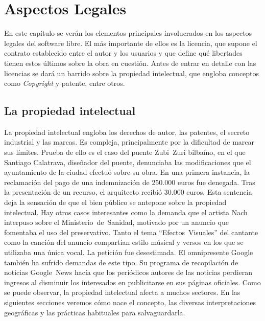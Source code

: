 
\chapter{Aspectos Legales}
En este capítulo se verán los elementos principales involucrados en
los aspectos legales del software libre. El más importante de ellos es
la licencia, que supone el contrato establecido entre el autor y los
usuarios y que define qué libertades tienen estos últimos sobre la
obra en cuestión. Antes de entrar en detalle con las licencias se dará
un barrido sobre la propiedad intelectual, que engloba conceptos como
\emph{Copyright} y patente, entre otros.

\section{La propiedad intelectual}
La propiedad intelectual engloba los derechos de autor, las patentes,
el secreto industrial y las marcas. Es compleja, principalmente por la
dificultad de marcar sus límites. Prueba de ello es el caso del puente
Zubi~Zuri bilbaíno, en el que Santiago Calatrava, diseñador del
puente, denunciaba las modificaciones que el ayuntamiento de la ciudad
efectuó sobre su obra. En una primera instancia, la reclamación del
pago de una indemnización de 250.000 euros fue denegada. Tras la
presentación de un recurso, el arquitecto recibió 30.000 euros. Esta
sentencia deja la sensación de que el bien público se antepone sobre
la propiedad intelectual. Hay otros casos interesantes como la demanda
que el artista Nach interpuso sobre el Ministerio~de~Sanidad, motivado
por un anuncio que fomentaba el uso del preservativo. Tanto el tema
``Efectos~Visuales'' del cantante como la canción del anuncio
compartían estilo músical y versos en los que se utilizaba una única
vocal. La petición fue desestimada. El omnipresente Google también ha
sufrido demandas de este tipo. Su programa de recopilación de noticias
Google~News hacía que los periódicos autores de las noticias perdieran
ingresos al disminuir los interesados en publicitarse en sus páginas
oficiales. Como se puede observar, la propiedad intelectual afecta a
muchos sectores. En las siguientes secciones veremos cómo nace el
concepto, las diversas interpretaciones geográficas y las prácticas
habituales para salvaguardarla.

